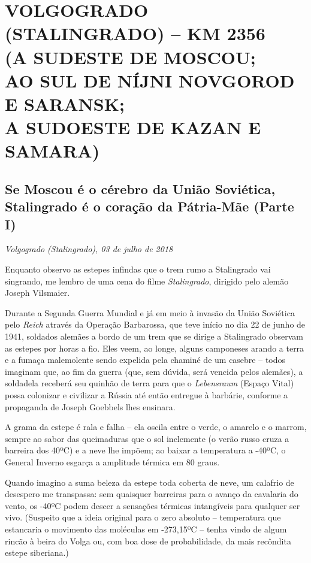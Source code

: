 \movetooddpage
{}
\part*{VOLGOGRADO (STALINGRADO) -- KM 2356\\(A SUDESTE DE MOSCOU;\\AO SUL DE NÍJNI NOVGOROD E SARANSK;\\A SUDOESTE DE KAZAN E SAMARA)}

\chapter*{Se Moscou é o cérebro da União Soviética, Stalingrado é o coração da Pátria-Mãe (Parte I)}

\begin{flushright}
\emph{Volgogrado (Stalingrado), 03 de julho de 2018}
\end{flushright}

Enquanto observo as estepes infindas que o trem rumo a Stalingrado vai
singrando, me lembro de uma cena do filme \emph{Stalingrado}, dirigido
pelo alemão Joseph Vilsmaier.

Durante a Segunda Guerra Mundial e já em meio à invasão da União
Soviética pelo  \emph{Reich} através da Operação Barbarossa, que teve
início no dia 22 de junho de 1941, soldados alemães a bordo de um trem
que se dirige a Stalingrado observam as estepes por horas a fio. Eles
veem, ao longe, alguns camponeses arando a terra e a fumaça malemolente
sendo expelida pela chaminé de um casebre -- todos imaginam que, ao fim
da guerra (que, sem dúvida, será vencida pelos alemães), a soldadela
receberá seu quinhão de terra para que o \emph{Lebensraum} (Espaço
Vital) possa colonizar e civilizar a Rússia até então entregue à
barbárie, conforme a propaganda de Joseph Goebbels lhes ensinara.

A grama da estepe é rala e falha -- ela oscila entre o verde, o amarelo
e o marrom, sempre ao sabor das queimaduras que o sol inclemente (o
verão russo cruza a barreira dos 40ºC) e a neve lhe impõem; ao baixar a
temperatura a -40ºC, o General Inverno esgarça a amplitude térmica em 80
graus.

Quando imagino a suma beleza da estepe toda coberta de neve, um calafrio
de desespero me transpassa: sem quaisquer barreiras para o avanço da
cavalaria do vento, os -40ºC podem descer a sensações térmicas intangíveis para qualquer ser vivo. (Suspeito que a ideia original para o zero absoluto -- temperatura que
estancaria o movimento das moléculas em -273,15ºC -- tenha vindo de algum rincão à beira do Volga ou, com boa dose de probabilidade, da mais recôndita estepe siberiana.)

